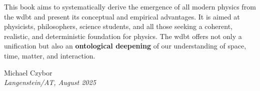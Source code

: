 \documentclass[11pt, a5paper, twoside, openright]{book}
\begin{document}
This book aims to systematically derive the emergence of all modern physics from the \gls{wdbt} and present its conceptual and empirical advantages. It is aimed at physicists, philosophers, science students, and all those seeking a coherent, realistic, and deterministic foundation for physics. The \gls{wdbt} offers not only a unification but also an \textbf{ontological deepening} of our understanding of space, time, matter, and interaction.

\begin{flushright}
    Michael Czybor \\
    \emph{Langenstein/AT, August 2025}
\end{flushright}

\tableofcontents
\listoffigures
\listoftables

\mainmatter






\appendix


\backmatter
\printbibliography[title=Bibliography]
\glswritefiles
\printglossary[title=Glossary]
\printglossary[type=acronym, title=Abbreviations]
\end{document}
